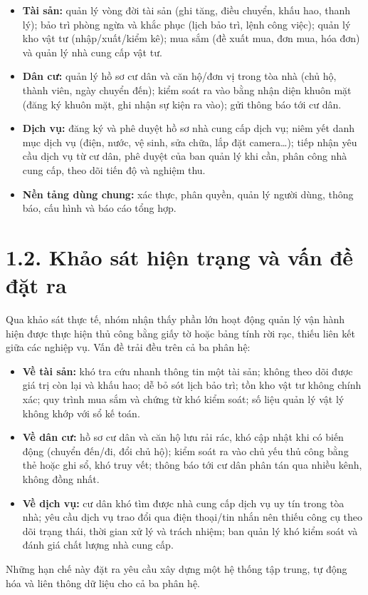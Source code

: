 \begin{itemize}[leftmargin=1.4em,itemsep=1pt,topsep=2pt]
  \item \textbf{Tài sản: }quản lý vòng đời tài sản (ghi tăng, điều chuyển, khấu hao, thanh lý); bảo trì phòng ngừa và khắc phục (lịch bảo trì, lệnh công việc); quản lý kho vật tư (nhập/xuất/kiểm kê); mua sắm (đề xuất mua, đơn mua, hóa đơn) và quản lý nhà cung cấp vật tư.
  \item \textbf{Dân cư: }quản lý hồ sơ cư dân và căn hộ/đơn vị trong tòa nhà (chủ hộ, thành viên, ngày chuyển đến); kiểm soát ra vào bằng nhận diện khuôn mặt (đăng ký khuôn mặt, ghi nhận sự kiện ra vào); gửi thông báo tới cư dân.
  \item \textbf{Dịch vụ: }đăng ký và phê duyệt hồ sơ nhà cung cấp dịch vụ; niêm yết danh mục dịch vụ (điện, nước, vệ sinh, sửa chữa, lắp đặt camera\ldots{}); tiếp nhận yêu cầu dịch vụ từ cư dân, phê duyệt của ban quản lý khi cần, phân công nhà cung cấp, theo dõi tiến độ và nghiệm thu.
  \item \textbf{Nền tảng dùng chung: }xác thực, phân quyền, quản lý người dùng, thông báo, cấu hình và báo cáo tổng hợp.
\end{itemize}
\section*{1.2. Khảo sát hiện trạng và vấn đề đặt ra}
Qua khảo sát thực tế, nhóm nhận thấy phần lớn hoạt động quản lý vận hành hiện được thực hiện thủ công bằng giấy tờ hoặc bảng tính rời rạc, thiếu liên kết giữa các nghiệp vụ. Vấn đề trải đều trên cả ba phân hệ:

\begin{itemize}[leftmargin=1.4em,itemsep=1pt,topsep=2pt]
  \item \textbf{Về tài sản: }khó tra cứu nhanh thông tin một tài sản; không theo dõi được giá trị còn lại và khấu hao; dễ bỏ sót lịch bảo trì; tồn kho vật tư không chính xác; quy trình mua sắm và chứng từ khó kiểm soát; số liệu quản lý vật lý không khớp với sổ kế toán.
  \item \textbf{Về dân cư: }hồ sơ cư dân và căn hộ lưu rải rác, khó cập nhật khi có biến động (chuyển đến/đi, đổi chủ hộ); kiểm soát ra vào chủ yếu thủ công bằng thẻ hoặc ghi sổ, khó truy vết; thông báo tới cư dân phân tán qua nhiều kênh, không đồng nhất.
  \item \textbf{Về dịch vụ: }cư dân khó tìm được nhà cung cấp dịch vụ uy tín trong tòa nhà; yêu cầu dịch vụ trao đổi qua điện thoại/tin nhắn nên thiếu công cụ theo dõi trạng thái, thời gian xử lý và trách nhiệm; ban quản lý khó kiểm soát và đánh giá chất lượng nhà cung cấp.
\end{itemize}
Những hạn chế này đặt ra yêu cầu xây dựng một hệ thống tập trung, tự động hóa và liên thông dữ liệu cho cả ba phân hệ.

